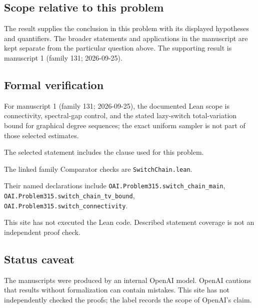 \documentclass[11pt]{article}
\begin{document}
\subsection{Scope relative to this problem}
The result supplies the conclusion in this problem with its displayed hypotheses and quantifiers. The broader statements and applications in the manuscript are kept separate from the particular question above. The supporting result is manuscript 1 (family 131; 2026-09-25).

\subsection{Formal verification}
For manuscript 1 (family 131; 2026-09-25), the documented Lean scope is connectivity, spectral-gap control, and the stated lazy-switch total-variation bound for graphical degree sequences; the exact uniform sampler is not part of those selected estimates.

The selected statement includes the clause used for this problem.

The linked family Comparator checks are \texttt{SwitchChain.lean}.

Their named declarations include \texttt{OAI.Problem315.switch\_chain\_main}, \texttt{OAI.Problem315.switch\_chain\_tv\_bound}, \texttt{OAI.Problem315.switch\_connectivity}.

This site has not executed the Lean code. Described statement coverage is not an independent proof check.

\subsection{Status caveat}
The manuscripts were produced by an internal OpenAI model. OpenAI cautions that results without formalization can contain mistakes. This site has not independently checked the proofs; the label records the scope of OpenAI's claim.
\end{document}
